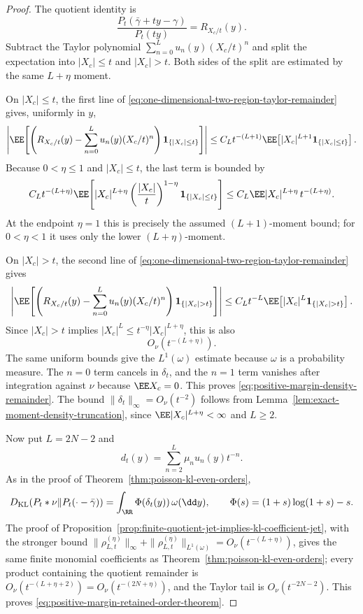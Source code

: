 \ifdefined\JFAArticleMain
{}
\else
\begin{proof}
The quotient identity is
\[
\frac{P_t(\bar{\gamma}+ty-\gamma)}{P_t(ty)}
=R_{X_c/t}(y).
\]
Subtract the Taylor polynomial
\(\sum_{n=0}^{L}u_n(y)(X_c/t)^n\) and split the expectation into
\(|X_c|\le t\) and \(|X_c|>t\).  Both sides of the split are estimated by the
same \(L+\eta\) moment.

On \(|X_c|\le t\), the first line of
\eqref{eq:one-dimensional-two-region-taylor-remainder} gives, uniformly in
\(y\),
\[
\left|
\EE\!\left[
\left(R_{X_c/t}(y)-\sum_{n=0}^{L}u_n(y)(X_c/t)^n\right)
\mathbf1_{\{|X_c|\le t\}}
\right]\right|
\le
C_Lt^{-(L+1)}
\EE\!\left[|X_c|^{L+1}\mathbf1_{\{|X_c|\le t\}}\right].
\]
Because \(0<\eta\le1\) and \(|X_c|\le t\), the last term is bounded by
\[
C_Lt^{-(L+\eta)}
\EE\!\left[
|X_c|^{L+\eta}
\left(\frac{|X_c|}{t}\right)^{1-\eta}
\mathbf1_{\{|X_c|\le t\}}
\right]
\le
C_L\EE|X_c|^{L+\eta}\,t^{-(L+\eta)} .
\]
At the endpoint \(\eta=1\) this is precisely the assumed
\((L+1)\)-moment bound; for \(0<\eta<1\) it uses only the lower
\((L+\eta)\)-moment.

On \(|X_c|>t\), the second line of
\eqref{eq:one-dimensional-two-region-taylor-remainder} gives
\[
\left|
\EE\!\left[
\left(R_{X_c/t}(y)-\sum_{n=0}^{L}u_n(y)(X_c/t)^n\right)
\mathbf1_{\{|X_c|>t\}}
\right]\right|
\le
C_Lt^{-L}\EE\!\left[|X_c|^L\mathbf1_{\{|X_c|>t\}}\right].
\]
Since \(|X_c|>t\) implies
\(|X_c|^L\le t^{-\eta}|X_c|^{L+\eta}\), this is also
\[
O_\nu(t^{-(L+\eta)}).
\]
The same uniform bounds give the \(L^1(\omega)\) estimate because
\(\omega\) is a probability measure.  The \(n=0\) term cancels in
\(\delta_t\), and the \(n=1\) term vanishes after integration against
\(\nu\) because \(\EE X_c=0\).  This proves
\eqref{eq:positive-margin-density-remainder}.  The bound
\(\|\delta_t\|_\infty=O_\nu(t^{-2})\) follows from
Lemma~\ref{lem:exact-moment-density-truncation}, since
\(\EE|X_c|^{L+\eta}<\infty\) and \(L\ge2\).

Now put \(L=2N-2\) and
\[
d_t(y)=\sum_{n=2}^{L}\mu_nu_n(y)t^{-n}.
\]
As in the proof of Theorem~\ref{thm:poisson-kl-even-orders},
\[
D_{\mathrm{KL}}(P_t*\nu\|P_t(\cdot-\bar{\gamma}))
=\int_{\RR}\Phi(\delta_t(y))\,\omega(\dd y),
\qquad
\Phi(s)=(1+s)\log(1+s)-s .
\]
The proof of
Proposition~\ref{prop:finite-quotient-jet-implies-kl-coefficient-jet}, with
the stronger bound
\(\|\rho_{L,t}^{(\eta)}\|_\infty+
\|\rho_{L,t}^{(\eta)}\|_{L^1(\omega)}
=O_\nu(t^{-(L+\eta)})\), gives the same finite monomial coefficients as
Theorem~\ref{thm:poisson-kl-even-orders}; every product containing the
quotient remainder is
\(O_\nu(t^{-(L+\eta+2)})=O_\nu(t^{-(2N+\eta)})\), and the Taylor tail is
\(O_\nu(t^{-2N-2})\).  This proves
\eqref{eq:positive-margin-retained-order-theorem}.
\end{proof}
\fi

